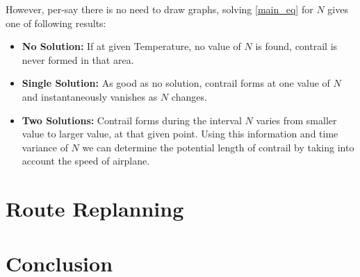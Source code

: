 \documentclass[a4paper, 12pt]{report}
\begin{document}
However, per-say there is no need to draw graphs, solving \ref{main_eq} for $N$ gives one of following results:
\begin{itemize}
        \item \textbf{No Solution: } If at given Temperature, no value of $N$ is found, contrail is never formed in that area.
        \item \textbf{Single Solution: } As good as no solution, contrail forms at one value of $N$ and instantaneously vanishes as $N$ changes.
        \item \textbf{Two Solutions: } Contrail forms during the interval $N$ varies from smaller value to larger value, at that given point. Using this information and time variance of $N$ we can determine the potential length of contrail by taking into account the speed of airplane.
\end{itemize}


\chapter{Route Replanning}

\chapter{Conclusion}


\printbibliography
    
\end{document}
